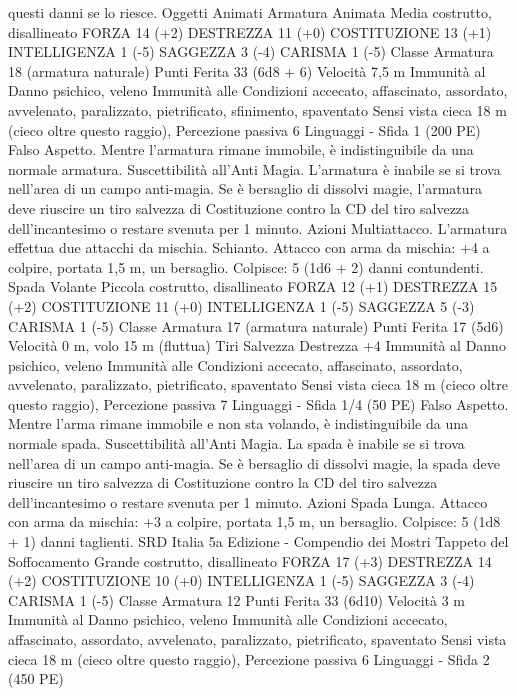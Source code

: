 \begin{multicols}{2}
questi danni se lo riesce.
Oggetti Animati
Armatura Animata
Media costrutto, disallineato
FORZA 14 (+2)
DESTREZZA 11 (+0)
COSTITUZIONE 13 (+1)
INTELLIGENZA 1 (-5)
SAGGEZZA 3 (-4)
CARISMA 1 (-5)
Classe Armatura 18 (armatura naturale)
Punti Ferita 33 (6d8 + 6)
Velocità 7,5 m
Immunità al Danno psichico, veleno
Immunità alle Condizioni accecato, affascinato, assordato,
avvelenato, paralizzato, pietrificato, sfinimento, spaventato
Sensi vista cieca 18 m (cieco oltre questo raggio), Percezione
passiva 6
Linguaggi -
Sfida 1 (200 PE)
Falso Aspetto. Mentre l’armatura rimane immobile, è
indistinguibile da una normale armatura.
Suscettibilità all’Anti Magia. L’armatura è inabile se si trova
nell’area di un campo anti-magia. Se è bersaglio di dissolvi
magie, l’armatura deve riuscire un tiro salvezza di Costituzione
contro la CD del tiro salvezza dell’incantesimo o restare svenuta
per 1 minuto.
Azioni
Multiattacco. L’armatura effettua due attacchi da mischia.
Schianto. Attacco con arma da mischia: +4 a colpire, portata 1,5
m, un bersaglio.
Colpisce: 5 (1d6 + 2) danni contundenti.
Spada Volante
Piccola costrutto, disallineato
FORZA 12 (+1)
DESTREZZA 15 (+2)
COSTITUZIONE 11 (+0)
INTELLIGENZA 1 (-5)
SAGGEZZA 5 (-3)
CARISMA 1 (-5)
Classe Armatura 17 (armatura naturale)
Punti Ferita 17 (5d6)
Velocità 0 m, volo 15 m (fluttua)
Tiri Salvezza Destrezza +4
Immunità al Danno psichico, veleno
Immunità alle Condizioni accecato, affascinato, assordato,
avvelenato, paralizzato, pietrificato, spaventato
Sensi vista cieca 18 m (cieco oltre questo raggio), Percezione
passiva 7
Linguaggi -
Sfida 1/4 (50 PE)
Falso Aspetto. Mentre l’arma rimane immobile e non sta
volando, è indistinguibile da una normale spada.
Suscettibilità all’Anti Magia. La spada è inabile se si trova
nell’area di un campo anti-magia. Se è bersaglio di dissolvi
magie, la spada deve riuscire un tiro salvezza di Costituzione
contro la CD del tiro salvezza dell’incantesimo o restare svenuta
per 1 minuto.
Azioni
Spada Lunga. Attacco con arma da mischia: +3 a colpire,
portata 1,5 m, un bersaglio.
Colpisce: 5 (1d8 + 1) danni taglienti.
SRD Italia 5a Edizione - Compendio dei Mostri
Tappeto del Soffocamento
Grande costrutto, disallineato
FORZA 17 (+3)
DESTREZZA 14 (+2)
COSTITUZIONE 10 (+0)
INTELLIGENZA 1 (-5)
SAGGEZZA 3 (-4)
CARISMA 1 (-5)
Classe Armatura 12
Punti Ferita 33 (6d10)
Velocità 3 m
Immunità al Danno psichico, veleno
Immunità alle Condizioni accecato, affascinato, assordato,
avvelenato, paralizzato, pietrificato, spaventato
Sensi vista cieca 18 m (cieco oltre questo raggio), Percezione
passiva 6
Linguaggi -
Sfida 2 (450 PE)

\end{multicols}
